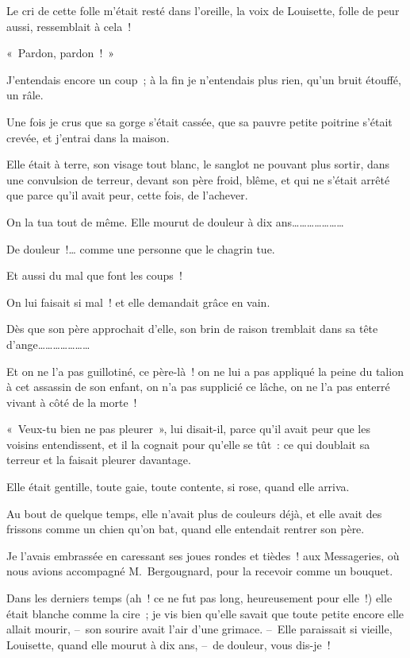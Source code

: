 \documentclass[french,twoside]{book} %
\begin{document}
Le cri de cette folle m’était resté dans l’oreille, la voix de Louisette, folle de peur aussi, ressemblait à cela !\par
« Pardon, pardon ! »\par
J’entendais encore un coup ; à la fin je n’entendais plus rien, qu’un bruit étouffé, un râle.\par
Une fois je crus que sa gorge s’était cassée, que sa pauvre petite poitrine s’était crevée, et j’entrai dans la maison.\par
Elle était à terre, son visage tout blanc, le sanglot ne pouvant plus sortir, dans une convulsion de terreur, devant son père froid, blême, et qui ne s’était arrêté que parce qu’il avait peur, cette fois, de l’achever.\par
\bigbreak
\noindent On la tua tout de même. Elle mourut de douleur à dix ans…………………\par
De douleur !… comme une personne que le chagrin tue.\par
Et aussi du mal que font les coups !\par
On lui faisait si mal ! et elle demandait grâce en vain.\par
Dès que son père approchait d’elle, son brin de raison tremblait dans sa tête d’ange…………………\par
Et on ne l’a pas guillotiné, ce père-là ! on ne lui a pas appliqué la peine du talion à cet assassin de son enfant, on n’a pas supplicié ce lâche, on ne l’a pas enterré vivant à côté de la morte !\par
« Veux-tu bien ne pas pleurer », lui disait-il, parce qu’il avait peur que les voisins entendissent, et il la cognait pour qu’elle se tût : ce qui doublait sa terreur et la faisait pleurer davantage.\par
\bigbreak
\noindent Elle était gentille, toute gaie, toute contente, si rose, quand elle arriva.\par
Au bout de quelque temps, elle n’avait plus de couleurs déjà, et elle avait des frissons comme un chien qu’on bat, quand elle entendait rentrer son père.\par
Je l’avais embrassée en caressant ses joues rondes et tièdes ! aux Messageries, où nous avions accompagné M. Bergougnard, pour la recevoir comme un bouquet.\par
Dans les derniers temps (ah ! ce ne fut pas long, heureusement pour elle !) elle était blanche comme la cire ; je vis bien qu’elle savait que toute petite encore elle allait mourir, – son sourire avait l’air d’une grimace. – Elle paraissait si vieille, Louisette, quand elle mourut à dix ans, – de douleur, vous dis-je !\par
\end{document}
